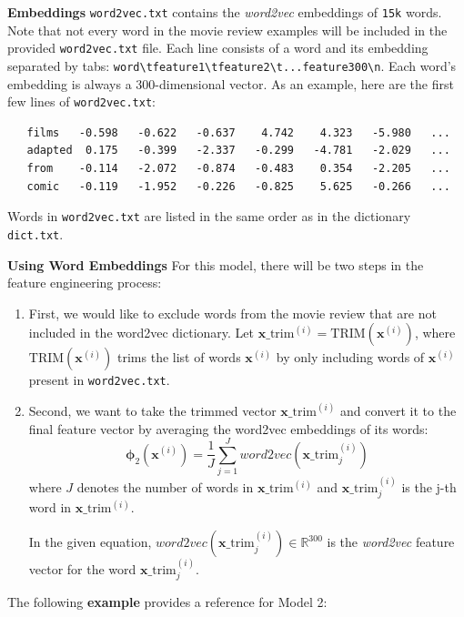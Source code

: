 \documentclass[11pt,addpoints,answers]{exam}
\newcommand{\xv}{\mathbf{x}}
\begin{document}
{\bf Embeddings }
\texttt{word2vec.txt} contains the \emph{word2vec} embeddings of \texttt{15k} words. Note that not every word in the movie review examples will be included in the provided \texttt{word2vec.txt} file. Each line consists of a word and its embedding separated by tabs: \lstinline{word\tfeature1\tfeature2\t...feature300\n}. Each word's embedding is always a 300-dimensional vector. As an example, here are the first few lines of \texttt{word2vec.txt}:
\begin{lstlisting}
   films   -0.598   -0.622   -0.637    4.742    4.323   -5.980   ...
   adapted  0.175   -0.399   -2.337   -0.299   -4.781   -2.029   ...
   from    -0.114   -2.072   -0.874   -0.483    0.354   -2.205   ...
   comic   -0.119   -1.952   -0.226   -0.825    5.625   -0.266   ...
\end{lstlisting}
Words in \texttt{word2vec.txt} are listed in the same order as in the dictionary \lstinline{dict.txt}.

{\bf Using Word Embeddings }
For this model, there will be two steps in the feature engineering process: 
    
\begin{enumerate}
    \item First, we would like to exclude words from the movie review that are not included in the word2vec dictionary. Let  $\xv\_\text{trim}^{(i)} = \text{TRIM}(\xv^{(i)})$, where $\text{TRIM}(\xv^{(i)})$ trims the list of words $\xv^{(i)}$ by only including words of $\xv^{(i)}$ present in \texttt{word2vec.txt}.
    \item Second, we want to take the trimmed vector $\xv\_\text{trim}^{(i)}$ and convert it to the final feature vector by averaging the word2vec embeddings of its words:
    $$\boldsymbol{\phi}_2\left(\xv^{(i)}\right) = \frac{1}{J} \sum_{j=1}^J word2vec(\xv\_\text{trim}^{(i)}_j) $$
    where $J$ denotes the number of words in $\xv\_\text{trim}^{(i)}$ and $\xv\_\text{trim}^{(i)}_j$ is the j-th word in $\xv\_\text{trim}^{(i)}$.
    
     In the given equation, $word2vec(\xv\_\text{trim}^{(i)}_j) \in \mathbb{R}^{300}$ is the \emph{word2vec} feature vector for the word $\xv\_\text{trim}^{(i)}_j$.
\end{enumerate}
    
The following \textbf{example} provides a reference for Model 2:
\end{document}
